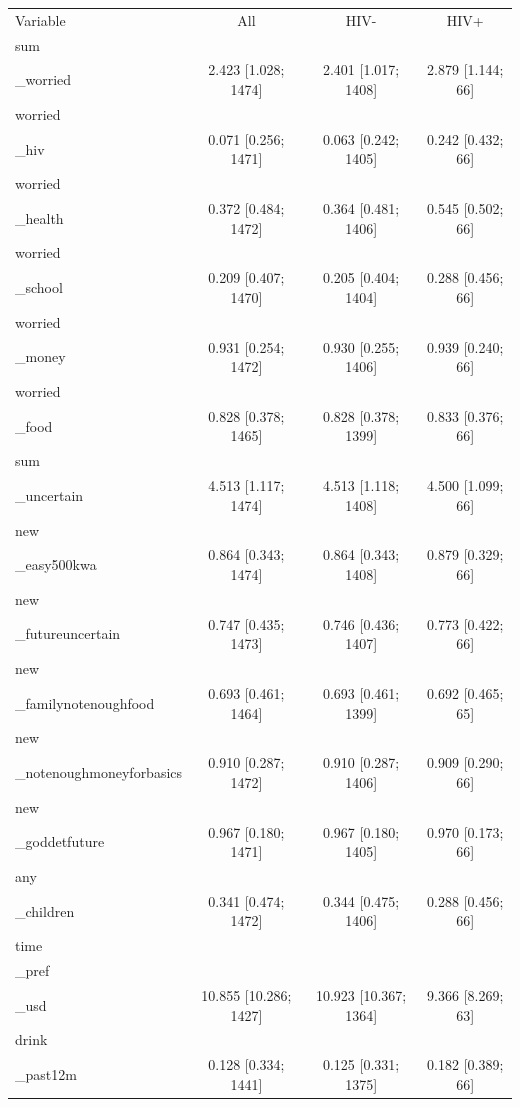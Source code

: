 \begin{tabular}{lccc}
\hline
Variable & All & HIV- & HIV+ \\
sum\\_worried & 2.423 [1.028; 1474] & 2.401 [1.017; 1408] & 2.879 [1.144; 66] \\
worried\\_hiv & 0.071 [0.256; 1471] & 0.063 [0.242; 1405] & 0.242 [0.432; 66] \\
worried\\_health & 0.372 [0.484; 1472] & 0.364 [0.481; 1406] & 0.545 [0.502; 66] \\
worried\\_school & 0.209 [0.407; 1470] & 0.205 [0.404; 1404] & 0.288 [0.456; 66] \\
worried\\_money & 0.931 [0.254; 1472] & 0.930 [0.255; 1406] & 0.939 [0.240; 66] \\
worried\\_food & 0.828 [0.378; 1465] & 0.828 [0.378; 1399] & 0.833 [0.376; 66] \\
sum\\_uncertain & 4.513 [1.117; 1474] & 4.513 [1.118; 1408] & 4.500 [1.099; 66] \\
new\\_easy500kwa & 0.864 [0.343; 1474] & 0.864 [0.343; 1408] & 0.879 [0.329; 66] \\
new\\_futureuncertain & 0.747 [0.435; 1473] & 0.746 [0.436; 1407] & 0.773 [0.422; 66] \\
new\\_familynotenoughfood & 0.693 [0.461; 1464] & 0.693 [0.461; 1399] & 0.692 [0.465; 65] \\
new\\_notenoughmoneyforbasics & 0.910 [0.287; 1472] & 0.910 [0.287; 1406] & 0.909 [0.290; 66] \\
new\\_goddetfuture & 0.967 [0.180; 1471] & 0.967 [0.180; 1405] & 0.970 [0.173; 66] \\
any\\_children & 0.341 [0.474; 1472] & 0.344 [0.475; 1406] & 0.288 [0.456; 66] \\
time\\_pref\\_usd & 10.855 [10.286; 1427] & 10.923 [10.367; 1364] & 9.366 [8.269; 63] \\
drink\\_past12m & 0.128 [0.334; 1441] & 0.125 [0.331; 1375] & 0.182 [0.389; 66] \\

\end{tabular}
